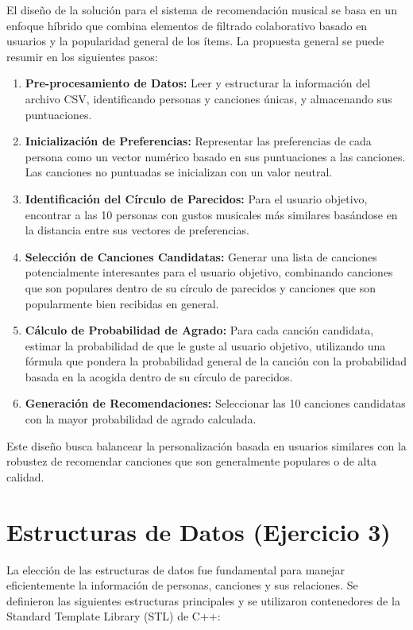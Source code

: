 \documentclass{article}
\begin{document}
El diseño de la solución para el sistema de recomendación musical se basa en un enfoque híbrido que combina elementos de filtrado colaborativo basado en usuarios y la popularidad general de los ítems. La propuesta general se puede resumir en los siguientes pasos:

\begin{enumerate}[label=\arabic*.] %
    \item \textbf{Pre-procesamiento de Datos:} Leer y estructurar la información del archivo CSV, identificando personas y canciones únicas, y almacenando sus puntuaciones.
    \item \textbf{Inicialización de Preferencias:} Representar las preferencias de cada persona como un vector numérico basado en sus puntuaciones a las canciones. Las canciones no puntuadas se inicializan con un valor neutral.
    \item \textbf{Identificación del Círculo de Parecidos:} Para el usuario objetivo, encontrar a las 10 personas con gustos musicales más similares basándose en la distancia entre sus vectores de preferencias.
    \item \textbf{Selección de Canciones Candidatas:} Generar una lista de canciones potencialmente interesantes para el usuario objetivo, combinando canciones que son populares dentro de su círculo de parecidos y canciones que son popularmente bien recibidas en general.
    \item \textbf{Cálculo de Probabilidad de Agrado:} Para cada canción candidata, estimar la probabilidad de que le guste al usuario objetivo, utilizando una fórmula que pondera la probabilidad general de la canción con la probabilidad basada en la acogida dentro de su círculo de parecidos.
    \item \textbf{Generación de Recomendaciones:} Seleccionar las 10 canciones candidatas con la mayor probabilidad de agrado calculada.
\end{enumerate}

Este diseño busca balancear la personalización basada en usuarios similares con la robustez de recomendar canciones que son generalmente populares o de alta calidad.

\section{Estructuras de Datos (Ejercicio 3)}

La elección de las estructuras de datos fue fundamental para manejar eficientemente la información de personas, canciones y sus relaciones. Se definieron las siguientes estructuras principales y se utilizaron contenedores de la Standard Template Library (STL) de C++:
\end{document}
